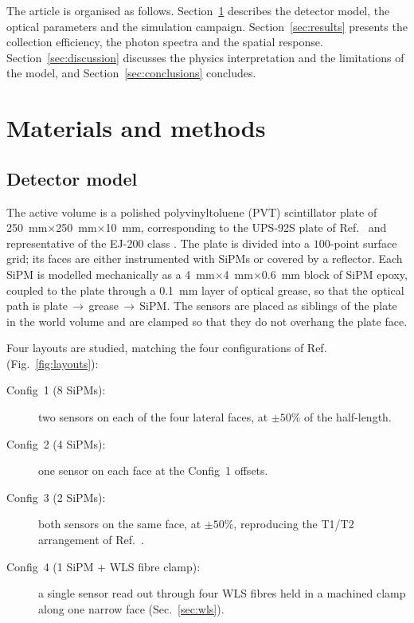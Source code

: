 \documentclass[3p]{elsarticle}
\newcommand{\sipm}{SiPM}
\begin{document}
The article is organised as follows. Section~\ref{sec:methods} describes the
detector model, the optical parameters and the simulation campaign.
Section~\ref{sec:results} presents the collection efficiency, the photon
spectra and the spatial response. Section~\ref{sec:discussion} discusses the
physics interpretation and the limitations of the model, and
Section~\ref{sec:conclusions} concludes.

\section{Materials and methods}
\label{sec:methods}

\subsection{Detector model}
\label{sec:geometry}

The active volume is a polished polyvinyltoluene (PVT) scintillator plate of
\SI{250}{\milli\meter}$\times$\SI{250}{\milli\meter}$\times$\SI{10}{\milli\meter},
corresponding to the UPS-92S plate of Ref.~\cite{Rao2025} and representative of
the EJ-200 class \cite{EljenEJ200}. The plate is divided into a $100$-point
surface grid; its faces are either instrumented with \sipm{}s or covered by a
reflector. Each \sipm{} is modelled mechanically as a
\SI{4}{\milli\meter}$\times$\SI{4}{\milli\meter}$\times$\SI{0.6}{\milli\meter}
block of \sipm{} epoxy, coupled to the plate through a
\SI{0.1}{\milli\meter} layer of optical grease, so that the optical path is
plate\,$\rightarrow$\,grease\,$\rightarrow$\,\sipm{}. The sensors are placed as
siblings of the plate in the world volume and are clamped so that they do not
overhang the plate face.

Four layouts are studied, matching the four configurations of
Ref.~\cite{Rao2025} (Fig.~\ref{fig:layouts}):
\begin{description}
  \item[Config~1 (8 \sipm{}s):] two sensors on each of the four lateral faces,
    at $\pm 50\%$ of the half-length.
  \item[Config~2 (4 \sipm{}s):] one sensor on each face at the Config~1
    offsets.
  \item[Config~3 (2 \sipm{}s):] both sensors on the same face, at $\pm 50\%$,
    reproducing the T1/T2 arrangement of Ref.~\cite{Rao2025}.
  \item[Config~4 (1 \sipm{} + WLS fibre clamp):] a single sensor read out
    through four WLS fibres held in a machined clamp along one narrow face
    (Sec.~\ref{sec:wls}).
\end{description}
\end{document}
